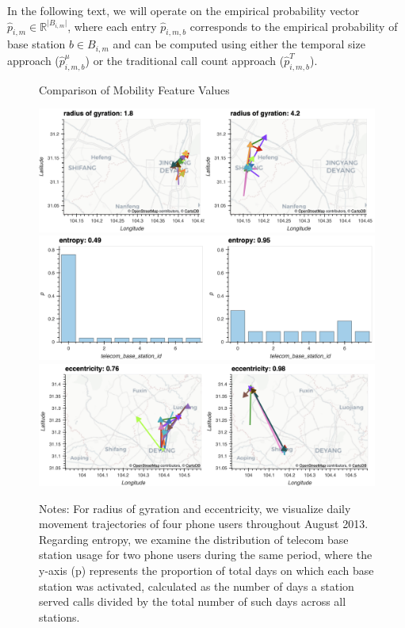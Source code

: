 In the following text, we will operate on the empirical probability vector $\hat{p}_{i, m} \in \mathbb{R}^{\lvert B_{i, m} \rvert}$, where each entry $\hat{p}_{i, m, b}$ corresponds to the empirical probability of base station $b \in B_{i, m}$ and can be computed using either the temporal size approach ($\hat{p}^{\mu}_{i, m, b}$) or the traditional call count approach ($\hat{p}^{T}_{i, m, b}$).

\clearpage\newpage
\begin{figure}[ht!]
\centering
\caption{Comparison of Mobility Feature Values}

\includegraphics[scale=0.35]{figures/rg_compare.png}
\includegraphics[scale=0.35]{figures/entropy_compare.png}
\includegraphics[scale=0.35]{figures/ecc_compare.png}

\vspace{0.1cm}
\caption*{Notes:  For radius of gyration and eccentricity, we visualize daily movement trajectories of four phone users throughout August 2013. Regarding entropy, we examine the distribution of telecom base station usage for two phone users during the same period, where the y-axis (p) represents the proportion of total days on which each base station was activated, calculated as the number of days a station served calls divided by the total number of such days across all stations.}
\label{fig:mobility}
\end{figure}

